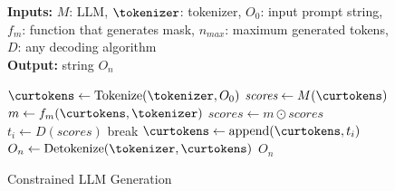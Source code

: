 \begin{figure}
\vspace{-.1in}
\begin{minipage}{0.55\textwidth}
\begin{algorithm}[H]
\small
\caption{Constrained LLM Generation}
\label{alg:masked}
%
\begin{flushleft}
\textbf{Inputs:} $M$: LLM, $\tokenizer$: tokenizer, $O_0$: input prompt string, \\
$f_m$: function that generates mask, $n_\textit{max}$: maximum generated tokens, $D$: any decoding algorithm \\
\textbf{Output:} string $O_n$
\end{flushleft}

\begin{algorithmic}[1]
\State $\curtokens \gets \text{Tokenize}(\tokenizer, O_0)$
\State $\textit{scores} \gets M(\curtokens)$
\State $m \gets f_{m}(\curtokens, \tokenizer)$
\State $\textit{scores} \gets m \odot \textit{scores}$
\State $t_i \gets D(\textit{scores})$
\State break
\EndIf
\State $\curtokens \gets \text{append}(\curtokens, t_i)$
\EndFor
\State $O_n \gets \text{Detokenize}(\tokenizer, \curtokens)$
\State \Return $O_n$
\EndFunction
\end{algorithmic}
\end{algorithm}

\end{minipage}
\vspace{-0.1in}
\end{figure}